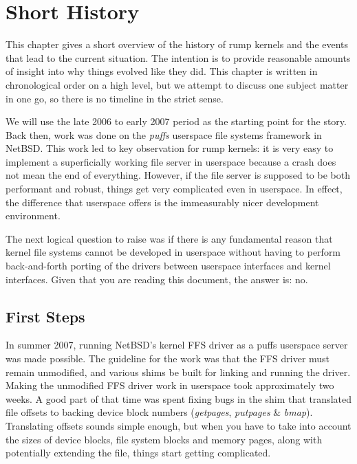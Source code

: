 
\section{Short History}

This chapter gives a short overview of the history of rump kernels and the
events that lead to the current situation.  The intention is to provide
reasonable amounts of insight into why things evolved like they did.
This chapter is written in chronological order on a high level, but we
attempt to discuss one subject matter in one go, so there is no timeline
in the strict sense.

We will use the late 2006 to early 2007 period as the starting point
for the story.  Back then, work was done on the \textit{puffs} userspace
file systems framework in NetBSD.  This work led to key observation for
rump kernels: it is very easy to implement a superficially working file
server in userspace because a crash does not mean the end of everything.
However, if the file server is supposed to be both performant and robust,
things get very complicated even in userspace.  In effect, the difference
that userspace offers is the immeasurably nicer development environment.

The next logical question to raise was if there is any fundamental reason
that kernel file systems cannot be developed in userspace without having
to perform back-and-forth porting of the drivers between userspace
interfaces and kernel interfaces.  Given that you are reading this
document, the answer is: no.


\subsection{First Steps}

In summer 2007, running NetBSD's kernel FFS driver as a puffs userspace
server was made possible.  The guideline for the work was that the FFS
driver must remain unmodified, and various shims be built for linking and
running the driver.  Making the unmodified FFS driver work in userspace
took approximately two weeks.  A good part of that time was spent
fixing bugs in the shim that translated file offsets to backing device
block numbers (\textit{getpages}, \textit{putpages} \& \textit{bmap}).
Translating offsets sounds simple enough, but when you have to take
into account the sizes of device blocks, file system blocks and memory
pages, along with potentially extending the file, things start getting
complicated.

